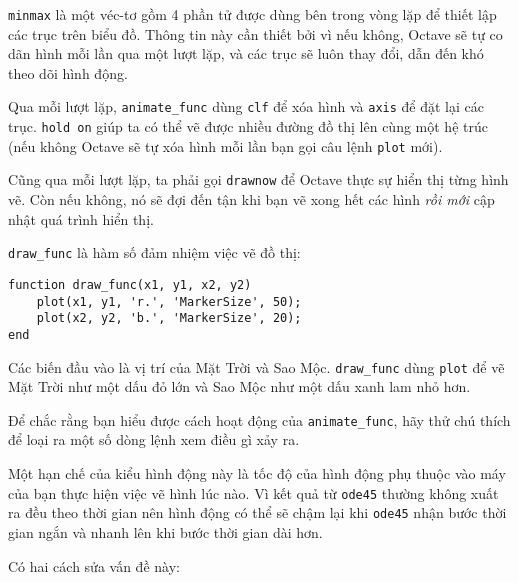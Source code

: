 \documentclass[12pt]{book}
\begin{document}
{\tt minmax}  là một véc-tơ gồm 4 phần tử được dùng bên trong 
vòng lặp để thiết lập các trục trên biểu đồ. Thông tin này cần thiết
bởi vì nếu không, Octave sẽ tự co dãn hình mỗi lần qua một
lượt lặp, và các trục sẽ luôn thay đổi, dẫn đến khó theo dõi
hình động.

Qua mỗi lượt lặp, \verb#animate_func# dùng {\tt clf}
để xóa hình và {\tt axis} để đặt lại các trục.  {\tt hold on} 
giúp ta có thể vẽ được nhiều đường đồ thị lên cùng một 
hệ trúc (nếu không Octave sẽ tự xóa hình mỗi lần
bạn gọi câu lệnh {\tt plot} mới).

Cũng qua mỗi lượt lặp, ta phải gọi {\tt drawnow} để
Octave thực sự hiển thị từng hình vẽ. Còn nếu không, nó sẽ
đợi đến tận khi bạn vẽ xong hết các hình {\em rồi mới} 
cập nhật quá trình hiển thị.

\verb#draw_func# là hàm số đảm nhiệm việc vẽ đồ thị:

\begin{verbatim}
function draw_func(x1, y1, x2, y2)
    plot(x1, y1, 'r.', 'MarkerSize', 50);
    plot(x2, y2, 'b.', 'MarkerSize', 20);
end
\end{verbatim}
%
Các biến đầu vào là vị trí của Mặt Trời và Sao Mộc. \verb#draw_func#
dùng {\tt plot} để vẽ Mặt Trời như một dấu đỏ lớn và Sao Mộc như
một dấu xanh lam nhỏ hơn.

\begin{ex}
Để chắc rằng bạn hiểu được cách hoạt động của \verb#animate_func#,
hãy thử chú thích để loại ra một số dòng lệnh xem điều gì xảy ra.
\end{ex}

Một hạn chế của kiểu hình động này là tốc độ của hình động phụ thuộc
vào máy của bạn thực hiện việc vẽ hình lúc nào. Vì kết quả từ
{\tt ode45} thường không xuất ra đều theo thời gian nên hình động
có thể sẽ chậm lại khi {\tt ode45} nhận bước thời gian ngắn và
nhanh lên khi bước thời gian dài hơn.

Có hai cách sửa vấn đề này:
\end{document}
